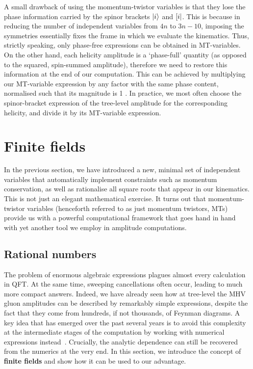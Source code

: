 \documentclass[main.tex]{subfiles}
\begin{document}
A small drawback of using the momentum-twistor variables is that they lose the phase information carried by the spinor brackets $|i \rangle$ and $\left[ i \right|$. This is because in reducing the number of independent variables from $4n$ to $3n-10$, imposing the symmetries essentially fixes the frame in which we evaluate the kinematics. Thus, strictly speaking, only phase-free expressions can be obtained in MT-variables. On the other hand, each helicity amplitude is a `phase-full' quantity (as opposed to the squared, spin-summed amplitude), therefore we need to restore this information at the end of our computation. This can be achieved by multiplying our MT-variable expression by any factor with the same phase content, normalised such that its magnitude is 1 . In practice, we most often choose the spinor-bracket expression of the tree-level amplitude for the corresponding helicity, and divide it by its MT-variable expression.
\section{Finite fields} \label{sec:FF}
In the previous section, we have introduced a new, minimal set of independent variables that automatically implement constraints such as momentum conservation, as well as rationalise all square roots that appear in our kinematics. This is not just an elegant mathematical exercise. It turns out that momentum-twistor variables (henceforth referred to as just momentum twistors, MTs) provide us with a powerful computational framework that goes hand in hand with yet another tool we employ in amplitude computations.
\subsection{Rational numbers} \label{sec:ratnums}
The problem of enormous algebraic expressions plagues almost every calculation in QFT. At the same time, sweeping cancellations often occur, leading to much more compact answers. Indeed, we have already seen how at tree-level the MHV gluon amplitudes can be described by remarkably simple expressions, despite the fact that they come from hundreds, if not thousands, of Feynman diagrams. A key idea that has emerged over the past several years is to avoid this complexity at the intermediate stages of the computation by working with numerical expressions instead~\cite{Peraro:2016wsq, Peraro:2019svx, Klappert:2019emp, Klappert:2020aqs, vonManteuffel:2014ixa, Abreu:2020xvt}. Crucially, the analytic dependence can still be recovered from the numerics at the very end. In this section, we introduce the concept of \textbf{finite fields} and show how it can be used to our advantage.
\end{document}
